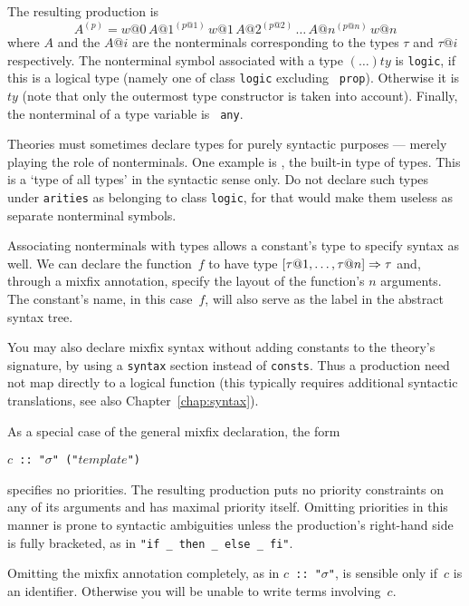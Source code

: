 %
The resulting production is \[ A^{(p)}= w@0\, A@1^{(p@1)}\, w@1\,
A@2^{(p@2)}\, \dots\, A@n^{(p@n)}\, w@n \] where $A$ and the $A@i$ are the
nonterminals corresponding to the types $\tau$ and $\tau@i$ respectively.
The nonterminal symbol associated with a type $(\ldots)ty$ is {\tt logic}, if
this is a logical type (namely one of class {\tt logic} excluding {\tt
prop}).  Otherwise it is $ty$ (note that only the outermost type constructor
is taken into account).  Finally, the nonterminal of a type variable is {\tt
any}.

\begin{warn}
  Theories must sometimes declare types for purely syntactic purposes ---
  merely playing the role of nonterminals. One example is , the
  built-in type of types.  This is a `type of all types' in the syntactic
  sense only.  Do not declare such types under {\tt arities} as belonging to
  class {\tt logic}, for that would make them useless as
  separate nonterminal symbols.
\end{warn}

Associating nonterminals with types allows a constant's type to specify
syntax as well.  We can declare the function~$f$ to have type $[\tau@1,
\ldots, \tau@n]\To \tau$ and, through a mixfix annotation, specify the layout
of the function's $n$ arguments.  The constant's name, in this case~$f$, will
also serve as the label in the abstract syntax tree.

You may also declare mixfix syntax without adding constants to the theory's
signature, by using a {\tt syntax} section instead of {\tt consts}.  Thus a
production need not map directly to a logical function (this typically
requires additional syntactic translations, see also
Chapter~\ref{chap:syntax}).


\medskip
As a special case of the general mixfix declaration, the form
\begin{center}
  {\tt $c$ ::\ "$\sigma$" ("$template$")}
\end{center}
specifies no priorities.  The resulting production puts no priority
constraints on any of its arguments and has maximal priority itself.
Omitting priorities in this manner is prone to syntactic ambiguities unless
the production's right-hand side is fully bracketed, as in
\verb|"if _ then _ else _ fi"|.

Omitting the mixfix annotation completely, as in {\tt $c$ ::\ "$\sigma$"},
is sensible only if~$c$ is an identifier.  Otherwise you will be unable to
write terms involving~$c$.


